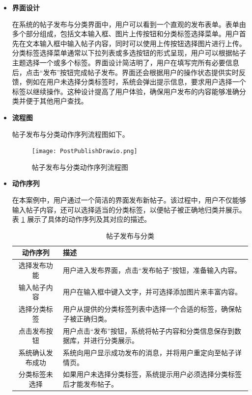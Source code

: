\begin{itemize}
	\item \textbf{界面设计}
	
	在系统的帖子发布与分类界面中，用户可以看到一个直观的发布表单。表单由多个部分组成，包括文本输入框、图片上传按钮和分类标签选择菜单。用户首先在文本输入框中输入帖子内容，同时可以使用上传按钮选择图片进行上传。分类标签选择菜单通常以下拉列表或多选按钮的形式呈现，用户可以根据帖子主题选择一个或多个标签。界面设计简洁明了，用户在填写完所有必要信息后，点击“发布”按钮完成帖子发布。界面还会根据用户的操作状态提供实时反馈，例如在用户未选择分类标签时，系统会弹出提示信息，要求用户选择一个标签以继续操作。这种设计提高了用户体验，确保用户发布的内容能够准确分类并便于其他用户查找。
	
	\item \textbf{流程图}
	
	帖子发布与分类动作序列流程图如下。
	
	\begin{figure}[H]
		\centering
		\texttt{[image: PostPublishDrawio.png]} 
		\caption{帖子发布与分类动作序列流程图}
		\label{fig:post-publish.drawio}
	\end{figure}
	
	\item \textbf{动作序列}
	
	在本案例中，用户通过一个简洁的界面发布新帖子。该过程中，用户不仅能够输入帖子内容，还可以选择适当的分类标签，以便帖子被正确地归类并展示。表 \ref{table:post-publish} 展示了具体的动作序列及其对应的描述。
	
	\begin{table}[H]
		\centering
		\caption{帖子发布与分类}
		\renewcommand\arraystretch{1.5}
		\begin{tabular}{|c|>{\raggedright\arraybackslash}p{8cm}|}
			\hline
			\textbf{动作序列} & \textbf{描述} \\ \hline
			选择发布功能 & 用户进入发布界面，点击“发布帖子”按钮，准备输入内容。 \\ \hline
			输入帖子内容 & 用户在输入框中键入文字，并可选择添加图片来丰富内容。 \\ \hline
			选择分类标签 & 用户从提供的分类标签列表中选择一个合适的标签，确保帖子被正确归类。 \\ \hline
			点击发布按钮 & 用户点击“发布”按钮，系统将帖子内容和分类信息保存到数据库，并进行分类展示。 \\ \hline
			系统确认发布成功 & 系统向用户显示成功发布的消息，并将用户重定向至帖子详情页。 \\ \hline
			分类标签未选择 & 如果用户未选择分类标签，系统提示用户必须选择分类标签后才能发布帖子。 \\ \hline
		\end{tabular}
		\label{table:post-publish}
	\end{table}
	

\end{itemize}
